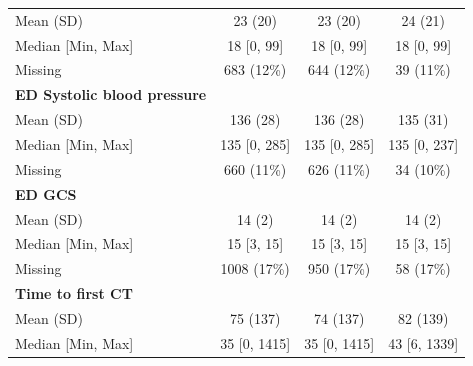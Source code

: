 \documentclass[12pt, a4paper]{article}
\begin{document}
\begin{table}[p]
{\begin{tabular}{lccc}
            \hspace{3mm}Mean (SD)                         & 23 (20)           & 23 (20)           & 24 (21)          \\
            \hspace{3mm}Median [Min, Max]                 & 18 [0, 99]        & 18 [0, 99]        & 18 [0, 99]       \\
            \hspace{3mm}Missing                           & 683 (12\%)        & 644 (12\%)        & 39 (11\%)        \\
            \textbf{ED Systolic blood pressure}           &                   &                   &                  \\
            \hspace{3mm}Mean (SD)                         & 136 (28)          & 136 (28)          & 135 (31)         \\
            \hspace{3mm}Median [Min, Max]                 & 135 [0, 285]      & 135 [0, 285]      & 135 [0, 237]     \\
            \hspace{3mm}Missing                           & 660 (11\%)        & 626 (11\%)        & 34 (10\%)        \\
            \textbf{ED GCS}                               &                   &                   &                  \\
            \hspace{3mm}Mean (SD)                         & 14 (2)            & 14 (2)            & 14 (2)           \\
            \hspace{3mm}Median [Min, Max]                 & 15 [3, 15]        & 15 [3, 15]        & 15 [3, 15]       \\
            \hspace{3mm}Missing                           & 1008 (17\%)       & 950 (17\%)        & 58 (17\%)        \\
            \textbf{Time to first CT}                     &                   &                   &                  \\
            \hspace{3mm}Mean (SD)                         & 75 (137)          & 74 (137)          & 82 (139)         \\
            \hspace{3mm}Median [Min, Max]                 & 35 [0, 1415]      & 35 [0, 1415]      & 43 [6, 1339]     \\

\end{tabular}}
\end{table}
\end{document}
